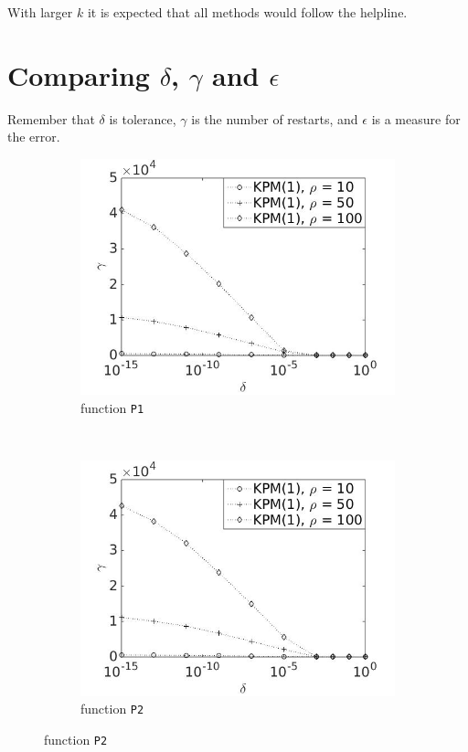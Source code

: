 With larger $k$ it is expected that all methods would follow the helpline.
\section{Comparing $\delta$, $\gamma$ and $\epsilon$ } \label{sec:div}
Remember that $\delta$ is tolerance, $\gamma$ is the number of restarts, and $\epsilon$ is a measure for the error.
\begin{figure}[H]
        \centering
        \begin{subfigure}[b]{0.45\textwidth}
                \includegraphics[width=\textwidth]{fig/s13antvstol1m}
                \caption{function \texttt{P1}}
                \label{fig:gammadelta1}
        \end{subfigure}
~
        \begin{subfigure}[b]{0.45\textwidth}
                \includegraphics[width=\textwidth]{fig/s14antvstol2m}
                \caption{ function \texttt{P2}}
                \label{fig:gammadelta2}
        \end{subfigure}
        

\end{figure}
